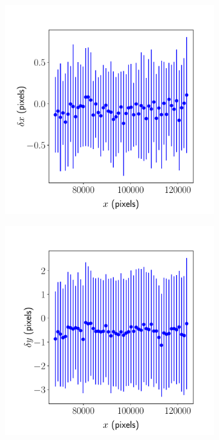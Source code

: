 \documentclass{article}
\begin{document}
\begin{figure}[ht]
	\centering
	\begin{subfigure}{0.24\linewidth}
		\includegraphics[width=\linewidth]{sine-wave-2-xx-JHUPolaris.pdf}
		\caption{}
		\label{fig:sinewave2xxJHUPolaris}
	\end{subfigure}
	\begin{subfigure}{0.24\linewidth}
		\includegraphics[width=\linewidth]{sine-wave-2-yx-JHUPolaris.pdf}

\end{subfigure}
\end{figure}
\end{document}
